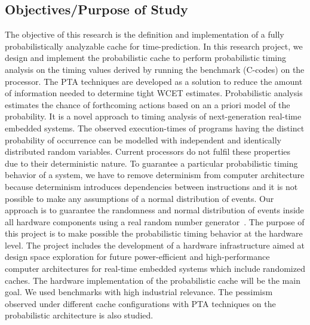 \subsection{Objectives/Purpose of Study}
The objective of this research is the definition and implementation of a fully probabilistically analyzable cache for time-prediction. In this research project, we design and implement the probabilistic cache to perform probabilistic timing analysis on the timing values derived by running the benchmark (C-codes) on the processor. The PTA techniques are developed as a solution to reduce the amount of information needed to determine tight WCET estimates. Probabilistic analysis estimates the chance of forthcoming actions based on an a priori model of the probability. It is a novel approach to timing analysis of next-generation real-time embedded systems. The observed execution-times of programs having the distinct probability of occurrence  can be modelled with independent and identically distributed random variables. Current processors do not fulfil these properties due to their deterministic nature. To guarantee a particular probabilistic timing behavior of a system, we have to remove determinism from computer architecture because determinism introduces dependencies between instructions and it is not possible to make any assumptions of a normal distribution of events. Our approach is to guarantee the randomness and normal distribution of events inside all hardware components using a real random number generator~\cite{Matsumoto:1998:MTE:272991.272995}. The purpose of this project is to make possible the probabilistic timing behavior at the hardware level. The project includes the development of a hardware infrastructure aimed at design space exploration for future power-efficient and high-performance computer architectures for real-time embedded systems which include randomized caches. The hardware implementation of the probabilistic cache will be the main goal.
We used benchmarks with high industrial relevance. The pessimism observed under different cache configurations with PTA techniques on the probabilistic architecture is also studied.

